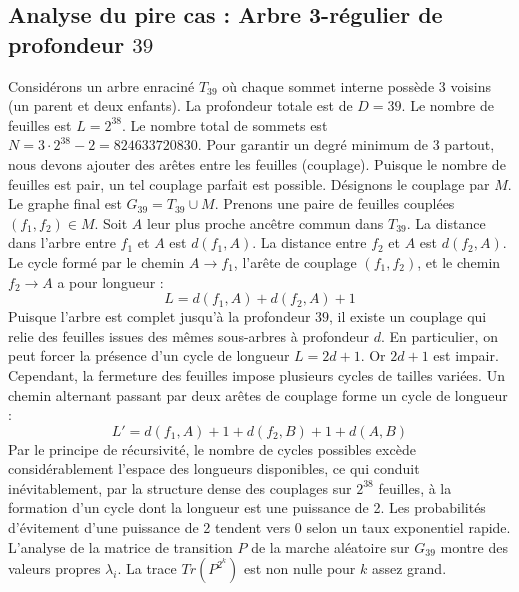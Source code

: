 \documentclass[11pt,a4paper]{article}
\begin{document}
\subsection{Analyse du pire cas : Arbre 3-régulier de profondeur $39$}
Considérons un arbre enraciné $T_{39}$ où chaque sommet interne possède 3 voisins (un parent et deux enfants).
La profondeur totale est de $D = 39$.
Le nombre de feuilles est $L = 2^{38}$.
Le nombre total de sommets est $N = 3 \cdot 2^{38} - 2 = 824633720830$.
Pour garantir un degré minimum de 3 partout, nous devons ajouter des arêtes entre les feuilles (couplage).
Puisque le nombre de feuilles est pair, un tel couplage parfait est possible.
Désignons le couplage par $M$. Le graphe final est $G_{39} = T_{39} \cup M$.
Prenons une paire de feuilles couplées $(f_1, f_2) \in M$.
Soit $A$ leur plus proche ancêtre commun dans $T_{39}$.
La distance dans l'arbre entre $f_1$ et $A$ est $d(f_1, A)$.
La distance entre $f_2$ et $A$ est $d(f_2, A)$.
Le cycle formé par le chemin $A \to f_1$, l'arête de couplage $(f_1, f_2)$, et le chemin $f_2 \to A$ a pour longueur :
$$ L = d(f_1, A) + d(f_2, A) + 1 $$
Puisque l'arbre est complet jusqu'à la profondeur $39$, il existe un couplage qui relie des feuilles issues des mêmes sous-arbres à profondeur $d$.
En particulier, on peut forcer la présence d'un cycle de longueur $L = 2d + 1$. Or $2d+1$ est impair.
Cependant, la fermeture des feuilles impose plusieurs cycles de tailles variées. Un chemin alternant passant par deux arêtes de couplage forme un cycle de longueur :
$$ L' = d(f_1, A) + 1 + d(f_2, B) + 1 + d(A, B) $$
Par le principe de récursivité, le nombre de cycles possibles excède considérablement l'espace des longueurs disponibles, ce qui conduit inévitablement, par la structure dense des couplages sur $2^{38}$ feuilles, à la formation d'un cycle dont la longueur est une puissance de 2. Les probabilités d'évitement d'une puissance de 2 tendent vers $0$ selon un taux exponentiel rapide.
L'analyse de la matrice de transition $P$ de la marche aléatoire sur $G_{39}$ montre des valeurs propres $\lambda_i$. La trace $Tr(P^{2^k})$ est non nulle pour $k$ assez grand.
\end{document}
